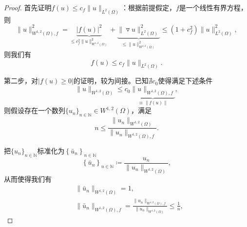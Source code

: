 \begin{proof}
  首先证明$f(u) \le c_f \big\| u \big\|_{L^{2}(\Omega)}$：根据前提假定，$f$是一个线性有界方程，则
  \begin{equation*}
      \big\| u \big\|_{W^{1,2}(\Omega), f}^2 = \underbrace{
      \left| f(u) \right|^2}_{\le c_f^2 \big\| u \big\|^2_{W^{1,2}(\Omega) }} + \underbrace{\big\| \triangledown u \big\|^2_{L^{2}(\Omega)}}_{\le \big\| u \big\|^2_{W^{1,2}(\Omega)}} \le \left(1+c_f^2\right) \big\| u \big\|^2_{L^{2}(\Omega)},
  \end{equation*}
则我们有
\begin{equation*}
  f(u) \le c_f \big\| u \big\|_{L^{2}(\Omega)}.
\end{equation*}


  第二步，对$\left|f(u) \ge 0\right|$的证明，较为间接。已知$\nexists c_0$使得满足下述条件
  \begin{equation*}
    \| u \|_{W^{1,2}(\Omega)} \le c_0 \underbrace{\|u \|_{W^{1,2}(\Omega), f}}_{ \equiv \|f(u)\|},
  \end{equation*}
则假设存在一个数列$\{u_n\}_{n \in \mathbb{N}} \in W^{1,2}(\Omega)$，满足
\begin{equation*}
n \le \frac{
\big\|u_n\big\|_{W^{1,2}(\Omega)}
}{\big\|u_n\big\|_{W^{1,2}(\Omega),f}}.
\end{equation*}

把$\{u_n\}_{n \in \mathbb{N}}$标准化为$\left\{\bar{u}_n\right\}_{n \in \mathbb{N}}$
\begin{equation*}
  \left\{ \bar{u}_n \right\}_{n \in \mathbb{N}} \coloneqq \frac{
  u_n
  }{
  \big\| u_n \big\|_{W^{1,2}(\Omega)}
  },
\end{equation*}
从而使得我们有
\begin{equation*}
  \begin{split}
    &\big\| \bar{u}_n \big\|_{W^{1,2}(\Omega)}=1,\\
    &\big\| \bar{u}_n \big\|_{W^{1,2}(\Omega), f} =
    \frac{
    \big\| u_n \big\|_{W^{1,2}(\Omega), f}
    }{
    \big\| u_n \big\|_{W^{1,2}(\Omega)}
    } \le \frac{1}{n},
  \end{split}
\end{equation*}


\end{proof}
